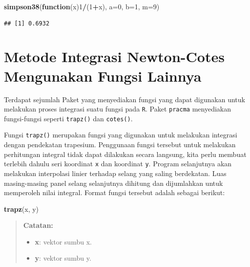 \documentclass[
]{book}
\newenvironment{Shaded}{\begin{snugshade}}{\end{snugshade}}
\newcommand{\AttributeTok}[1]{\textcolor[rgb]{0.13,0.29,0.53}{#1}}
\newcommand{\ControlFlowTok}[1]{\textcolor[rgb]{0.13,0.29,0.53}{\textbf{#1}}}
\newcommand{\DecValTok}[1]{\textcolor[rgb]{0.00,0.00,0.81}{#1}}
\newcommand{\FunctionTok}[1]{\textcolor[rgb]{0.13,0.29,0.53}{\textbf{#1}}}
\newcommand{\NormalTok}[1]{#1}
\newcommand{\SpecialCharTok}[1]{\textcolor[rgb]{0.81,0.36,0.00}{\textbf{#1}}}
\providecommand{\tightlist}{%
  \setlength{\itemsep}{0pt}\setlength{\parskip}{0pt}}
\theoremstyle{definition}
\theoremstyle{definition}
\theoremstyle{definition}
\theoremstyle{definition}
\theoremstyle{remark}
\begin{document}
\begin{Shaded}
\begin{Highlighting}[]
\FunctionTok{simpson38}\NormalTok{(}\ControlFlowTok{function}\NormalTok{(x)}\DecValTok{1}\SpecialCharTok{/}\NormalTok{(}\DecValTok{1}\SpecialCharTok{+}\NormalTok{x), }\AttributeTok{a=}\DecValTok{0}\NormalTok{, }\AttributeTok{b=}\DecValTok{1}\NormalTok{, }\AttributeTok{m=}\DecValTok{9}\NormalTok{)}
\end{Highlighting}
\end{Shaded}

\begin{verbatim}
## [1] 0.6932
\end{verbatim}

\hypertarget{metode-integrasi-newton-cotes-mengunakan-fungsi-lainnya}{%
\section{Metode Integrasi Newton-Cotes Mengunakan Fungsi Lainnya}\label{metode-integrasi-newton-cotes-mengunakan-fungsi-lainnya}}

Terdapat sejumlah Paket yang menyediakan fungsi yang dapat digunakan untuk melakukan proses integrasi suatu fungsi pada \texttt{R}. Paket \texttt{pracma} menyediakan fungsi-fungsi seperti \texttt{trapz()} dan \texttt{cotes()}.

Fungsi \texttt{trapz()} merupakan fungsi yang digunakan untuk melakukan integrasi dengan pendekatan trapesium. Penggunaan fungsi tersebut untuk melakukan perhitungan integral tidak dapat dilakukan secara langsung, kita perlu membuat terlebih dahulu seri koordinat \texttt{x} dan koordinat \texttt{y}. Program selanjutnya akan melakukan interpolasi linier terhadap selang yang saling berdekatan. Luas masing-masing panel selang selanjutnya dihitung dan dijumlahkan untuk memperoleh nilai integral. Format fungsi tersebut adalah sebagai berikut:

\begin{Shaded}
\begin{Highlighting}[]
\FunctionTok{trapz}\NormalTok{(x, y)}
\end{Highlighting}
\end{Shaded}

\begin{quote}
\textbf{Catatan:}

\begin{itemize}
\tightlist
\item
  \textbf{x}: vektor sumbu x.
\item
  \textbf{y}: vektor sumbu y.
\end{itemize}
\end{quote}
\end{document}
